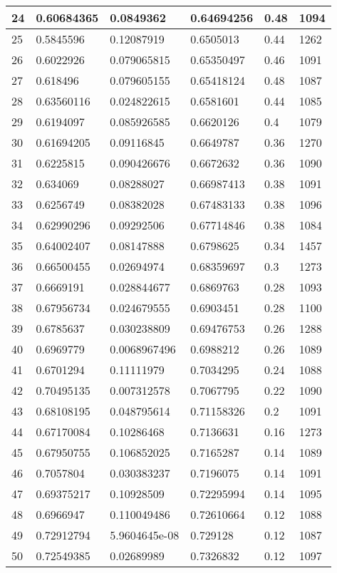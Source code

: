 \begin{longtable}{|l|l|l|l|l|l|}
24 & 0.60684365 & 0.0849362 & 0.64694256 & 0.48 & 1094 \\ \hline 
25 & 0.5845596 & 0.12087919 & 0.6505013 & 0.44 & 1262 \\ \hline 
26 & 0.6022926 & 0.079065815 & 0.65350497 & 0.46 & 1091 \\ \hline 
27 & 0.618496 & 0.079605155 & 0.65418124 & 0.48 & 1087 \\ \hline 
28 & 0.63560116 & 0.024822615 & 0.6581601 & 0.44 & 1085 \\ \hline 
29 & 0.6194097 & 0.085926585 & 0.6620126 & 0.4 & 1079 \\ \hline 
30 & 0.61694205 & 0.09116845 & 0.6649787 & 0.36 & 1270 \\ \hline 
31 & 0.6225815 & 0.090426676 & 0.6672632 & 0.36 & 1090 \\ \hline 
32 & 0.634069 & 0.08288027 & 0.66987413 & 0.38 & 1091 \\ \hline 
33 & 0.6256749 & 0.08382028 & 0.67483133 & 0.38 & 1096 \\ \hline 
34 & 0.62990296 & 0.09292506 & 0.67714846 & 0.38 & 1084 \\ \hline 
35 & 0.64002407 & 0.08147888 & 0.6798625 & 0.34 & 1457 \\ \hline 
36 & 0.66500455 & 0.02694974 & 0.68359697 & 0.3 & 1273 \\ \hline 
37 & 0.6669191 & 0.028844677 & 0.6869763 & 0.28 & 1093 \\ \hline 
38 & 0.67956734 & 0.024679555 & 0.6903451 & 0.28 & 1100 \\ \hline 
39 & 0.6785637 & 0.030238809 & 0.69476753 & 0.26 & 1288 \\ \hline 
40 & 0.6969779 & 0.0068967496 & 0.6988212 & 0.26 & 1089 \\ \hline 
41 & 0.6701294 & 0.11111979 & 0.7034295 & 0.24 & 1088 \\ \hline 
42 & 0.70495135 & 0.007312578 & 0.7067795 & 0.22 & 1090 \\ \hline 
43 & 0.68108195 & 0.048795614 & 0.71158326 & 0.2 & 1091 \\ \hline 
44 & 0.67170084 & 0.10286468 & 0.7136631 & 0.16 & 1273 \\ \hline 
45 & 0.67950755 & 0.106852025 & 0.7165287 & 0.14 & 1089 \\ \hline 
46 & 0.7057804 & 0.030383237 & 0.7196075 & 0.14 & 1091 \\ \hline 
47 & 0.69375217 & 0.10928509 & 0.72295994 & 0.14 & 1095 \\ \hline 
48 & 0.6966947 & 0.110049486 & 0.72610664 & 0.12 & 1088 \\ \hline 
49 & 0.72912794 & 5.9604645e-08 & 0.729128 & 0.12 & 1087 \\ \hline 
50 & 0.72549385 & 0.02689989 & 0.7326832 & 0.12 & 1097 \\ \hline 
\end{longtable}